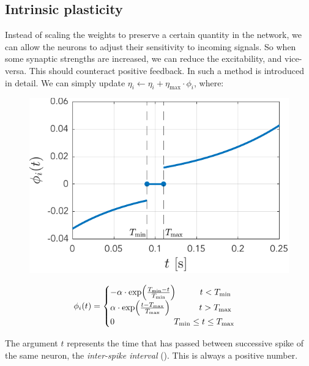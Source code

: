 \subsection{Intrinsic plasticity}
Instead of scaling the weights to preserve a certain quantity in the network, we can allow the neurons to adjust their sensitivity to incoming signals. So when some synaptic strengths are increased, we can reduce the excitability, and vice-versa. This should counteract positive feedback. In \cite{Song2017} such a method is introduced in detail. We can simply update $\eta_{i} \leftarrow \eta_{i} + \eta_{\max } \cdot \phi_{i}$, where: 
\begin{minipage}{.45\textwidth}
   \centering
   \begin{figure}[H]
	\centering
	\includegraphics[width = \textwidth]{../Figures/Learning/IPlearningFunction.pdf}
	\label{fig:IPlearningFunction}
	\end{figure}
\end{minipage}
\begin{minipage}{.55\textwidth}
\begin{align}
	\phi_{i} (t) =
	\begin{cases}
	-\alpha \cdot \exp \left(\frac{T_{\min }-t}{T_{\rm min }}\right) \hspace{10mm} t<T_{ \rm min } \\ 
	\alpha \cdot \exp \left(\frac{t-T_{\rm max }}{T_{\max }}\right) \hspace{12mm} t >T_{\rm max } \\ 
	0 \hspace{24.5mm} T_{ \rm min } \leq t \leq T_{\rm max }
	\end{cases}
\end{align}
\vspace{10mm}
\end{minipage}
The argument $t$ represents the time that has passed between successive spike of the same neuron, the \textsl{inter-spike interval} (\ISI). This is always a positive number.

